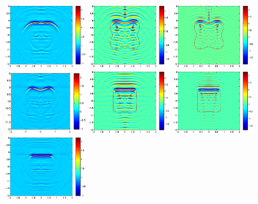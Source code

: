 {\begin{figure}[htbp]
	\includegraphics[width=0.32\textwidth]{./Img/graphic/peanut.eps}
	\includegraphics[width=0.32\textwidth]{./Img/graphic/p_leaf_3pi.eps}
	\includegraphics[width=0.32\textwidth]{./Img/graphic/p_leaf_5pi.eps}
	\includegraphics[width=0.32\textwidth]{./Img/graphic/p_leaf.eps}
	\includegraphics[width=0.32\textwidth]{./Img/graphic/rectangle_3pi.eps}
	\includegraphics[width=0.32\textwidth]{./Img/graphic/rectangle_5pi.eps}
	\includegraphics[width=0.32\textwidth]{./Img/graphic/rectangle.eps}
	

\end{figure}}
